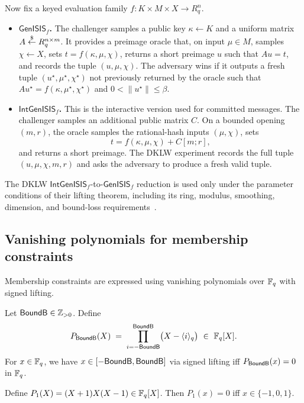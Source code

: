 Now fix a keyed evaluation family \(f:K\times M\times X\to R_q^n\).
\begin{itemize}[leftmargin=1.25em]
  \item \textbf{\(\mathsf{GenISIS}_f\).} The challenger samples a public key \(\kappa\gets K\) and a uniform matrix
  \(A\overset{\$}{\leftarrow} R_q^{n\times m}\). It provides a preimage oracle that, on input \(\mu\in M\), samples \(\chi\gets X\),
  sets \(t=f(\kappa,\mu,\chi)\), returns a short preimage \(u\) such that \(Au=t\), and records the tuple
  \((u,\mu,\chi)\). The adversary wins if it outputs a fresh tuple \((u^\star,\mu^\star,\chi^\star)\) not previously
  returned by the oracle such that \(Au^\star=f(\kappa,\mu^\star,\chi^\star)\) and \(0<\|u^\star\|\le \beta\).
  \item \textbf{\(\mathsf{IntGenISIS}_f\).} This is the interactive version used for committed messages.  The challenger
  samples an additional public matrix \(C\).  On a bounded opening \((m,r)\), the oracle samples the rational-hash
  inputs \((\mu,\chi)\), sets
  \[
    t=f(\kappa,\mu,\chi)+C[m;r],
  \]
  and returns a short preimage.  The DKLW experiment records the full tuple \((u,\mu,\chi,m,r)\) and asks the
  adversary to produce a fresh valid tuple.
\end{itemize}
The DKLW \(\mathsf{IntGenISIS}_f\)-to-\(\mathsf{GenISIS}_f\) reduction is used only under the parameter
conditions of their lifting theorem, including its ring, modulus, smoothing, dimension, and bound-loss
requirements~\cite[Theorem~6]{EPRINT:DKLW25}.

\subsection{Vanishing polynomials for membership constraints}
Membership constraints are expressed using vanishing polynomials over \(\mathbb{F}_q\) with signed lifting.

\begin{definition}\label{def:vanish-bound}
Let \(\mathsf{BoundB}\in\mathbb{Z}_{>0}\). Define
\[
  P_{\BoundB}(X) \;=\; \prod_{i=-\BoundB}^{\BoundB}\bigl(X-\langle i\rangle_q\bigr)\ \in\ \Fq[X].
\]
For \(x\in\mathbb{F}_q\), we have \(x\in[-\mathsf{BoundB},\mathsf{BoundB}]\) via signed lifting iff \(P_{\mathsf{BoundB}}(x)=0\) in \(\mathbb{F}_q\).
\end{definition}

\begin{definition}\label{def:vanish-carry}
Define \(P_{1}(X)=(X+1)X(X-1)\in\mathbb{F}_q[X]\). Then \(P_1(x)=0\) iff \(x\in\{-1,0,1\}\).
\end{definition}
